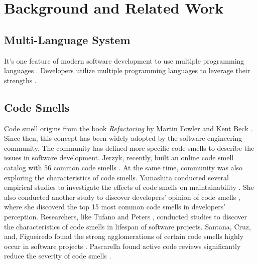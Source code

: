\section{Background and Related Work}
\label{sec:background}

\subsection{Multi-Language System}
\label{sec:Multi-Language System}

It's one feature of modern software development to use multiple programming languages \cite{723183}.
Developers utilize multiple programming languages to leverage their strengths \cite{7476675}.


\subsection{Code Smells}
\label{sec:Code Smells}
Code smell origins from the book \textit{Refactoring} by Martin Fowler and Kent Beck \cite{Fowler_Beck}.
Since then, this concept has been widely adopted by the software engineering community. The community has
defined more specific code smells \cite{Pysmell,SQLAntipatterns,CleanCode,RefactoringWorkbook} to describe the issues in software development. Jerzyk, recently, built
an online code smell catalog with 56 common code smells \cite{Jerzyk2023}.
At the same time, community was also exploring the characteristics of code smells. Yamashita
conducted several empirical studies to investigate the effects of code smells on maintainability \cite{6392174} \cite{6405287}. She
also conducted another study to discover developers' opinion of code smells \cite{developersCare}, where
she discoverd the top 15 most common code smells in developers' perception. Researchers, like Tufano \cite{whenandwhy} and Peters \cite{lifespan}, conducted studies to
discover the characteristics of code smells in lifespan of software projects. Santana, Cruz, and, Figueiredo found the
strong agglomerations of certain code smells highly occur in software projects \cite{Santana}. Pascarella found active code reviews significantly reduce the severity of code smells \cite{Pascarella}.

